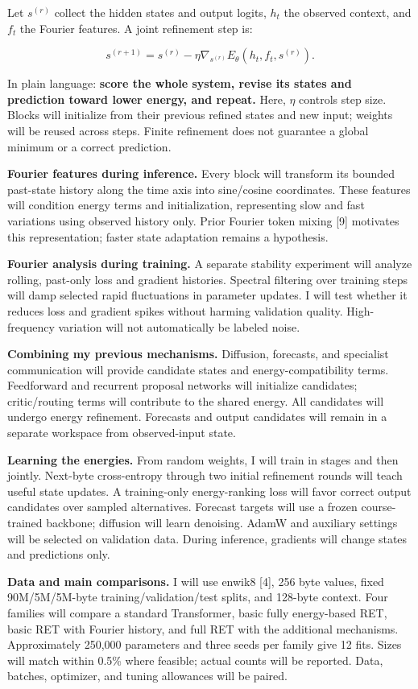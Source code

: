 \documentclass[11pt,letterpaper]{article}
\begin{document}
Let \(s^{(r)}\) collect the hidden states and output logits, \(h_t\) the observed context, and \(f_t\) the Fourier features. A joint refinement step is:

\[
s^{(r+1)}=s^{(r)}-\eta\nabla_{s^{(r)}}E_\theta(h_t,f_t,s^{(r)}).
\]

In plain language: \textbf{score the whole system, revise its states and prediction toward lower energy, and repeat.} Here, \(\eta\) controls step size. Blocks will initialize from their previous refined states and new input; weights will be reused across steps. Finite refinement does not guarantee a global minimum or a correct prediction.

\textbf{Fourier features during inference.} Every block will transform its bounded past-state history along the time axis into sine/cosine coordinates. These features will condition energy terms and initialization, representing slow and fast variations using observed history only. Prior Fourier token mixing [9] motivates this representation; faster state adaptation remains a hypothesis.

\textbf{Fourier analysis during training.} A separate stability experiment will analyze rolling, past-only loss and gradient histories. Spectral filtering over training steps will damp selected rapid fluctuations in parameter updates. I will test whether it reduces loss and gradient spikes without harming validation quality. High-frequency variation will not automatically be labeled noise.

\textbf{Combining my previous mechanisms.} Diffusion, forecasts, and specialist communication will provide candidate states and energy-compatibility terms. Feedforward and recurrent proposal networks will initialize candidates; critic/routing terms will contribute to the shared energy. All candidates will undergo energy refinement. Forecasts and output candidates will remain in a separate workspace from observed-input state.

\textbf{Learning the energies.} From random weights, I will train in stages and then jointly. Next-byte cross-entropy through two initial refinement rounds will teach useful state updates. A training-only energy-ranking loss will favor correct output candidates over sampled alternatives. Forecast targets will use a frozen course-trained backbone; diffusion will learn denoising. AdamW and auxiliary settings will be selected on validation data. During inference, gradients will change states and predictions only.

\textbf{Data and main comparisons.} I will use enwik8 [4], 256 byte values, fixed 90M/5M/5M-byte training/validation/test splits, and 128-byte context. Four families will compare a standard Transformer, basic fully energy-based RET, basic RET with Fourier history, and full RET with the additional mechanisms. Approximately 250,000 parameters and three seeds per family give 12 fits. Sizes will match within 0.5\% where feasible; actual counts will be reported. Data, batches, optimizer, and tuning allowances will be paired.
\end{document}
